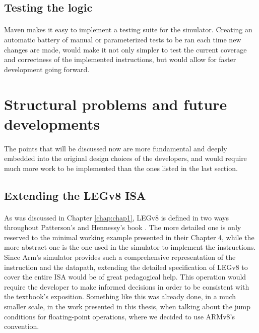 \subsection*{Testing the logic}
\paragraph{}
Maven makes it easy to implement a testing suite for the simulator. Creating an automatic battery of manual or parameterized tests to be ran each time new changes are made, would make it not only simpler to test the current coverage and correctness of the implemented instructions, but would allow for faster development going forward.

\section{Structural problems and future developments}
\paragraph{}
The points that will be discussed now are more fundamental and deeply embedded into the original design choices of the developers, and would require much more work to be implemented than the ones listed in the last section. 
\subsection{Extending the LEGv8 ISA}
\paragraph{}
As was discussed in Chapter \ref{chap:chap1}, LEGv8 is defined in two ways throughout Patterson's and Hennessy's book \cite{patterson2016computer}. The more detailed one is only reserved to the minimal working example presented in their Chapter 4, while the more abstract one is the one used in the simulator to implement the instructions. Since Arm's simulator provides such a comprehensive representation of the instruction and the datapath, extending the detailed specification of LEGv8 to cover the entire ISA would be of great pedagogical help. This operation would require the developer to make informed decisions in order to be consistent with the textbook's exposition. Something like this was already done, in a much smaller scale, in the work presented in this thesis, when talking about the jump conditions for floating-point operations, where we decided to use ARMv8's convention.
